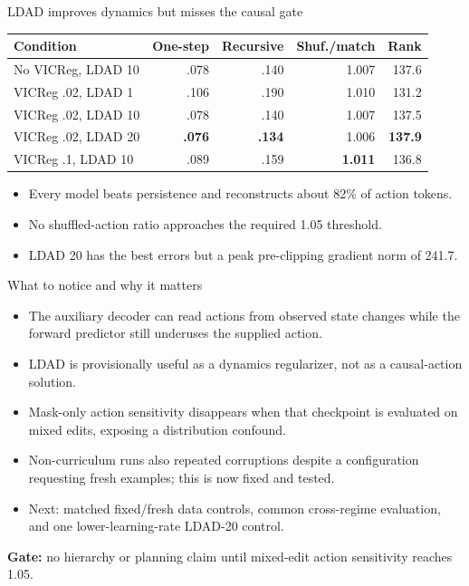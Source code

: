 \documentclass[aspectratio=169]{beamer}
\begin{document}
\begin{frame}{LDAD improves dynamics but misses the causal gate}
  \centering
  \begin{tabular}{lrrrr}
    \toprule
    Condition & One-step & Recursive & Shuf./match & Rank \\
    \midrule
    No VICReg, LDAD 10 & .078 & .140 & 1.007 & 137.6 \\
    VICReg .02, LDAD 1 & .106 & .190 & 1.010 & 131.2 \\
    VICReg .02, LDAD 10 & .078 & .140 & 1.007 & 137.5 \\
    VICReg .02, LDAD 20 & \textbf{.076} & \textbf{.134} & 1.006 & \textbf{137.9} \\
    VICReg .1, LDAD 10 & .089 & .159 & \textbf{1.011} & 136.8 \\
    \bottomrule
  \end{tabular}
  \vfill
  \begin{itemize}
    \item Every model beats persistence and reconstructs about 82\% of action tokens.
    \item No shuffled-action ratio approaches the required 1.05 threshold.
    \item LDAD 20 has the best errors but a peak pre-clipping gradient norm of 241.7.
  \end{itemize}
\end{frame}

\begin{frame}{What to notice and why it matters}
  \begin{itemize}
    \item The auxiliary decoder can read actions from observed state changes while the forward predictor still underuses the supplied action.
    \item LDAD is provisionally useful as a dynamics regularizer, not as a causal-action solution.
    \item Mask-only action sensitivity disappears when that checkpoint is evaluated on mixed edits, exposing a distribution confound.
    \item Non-curriculum runs also repeated corruptions despite a configuration requesting fresh examples; this is now fixed and tested.
    \item Next: matched fixed/fresh data controls, common cross-regime evaluation, and one lower-learning-rate LDAD-20 control.
  \end{itemize}
  \vfill
  \textbf{Gate:} no hierarchy or planning claim until mixed-edit action sensitivity reaches 1.05.
\end{frame}
\end{document}
